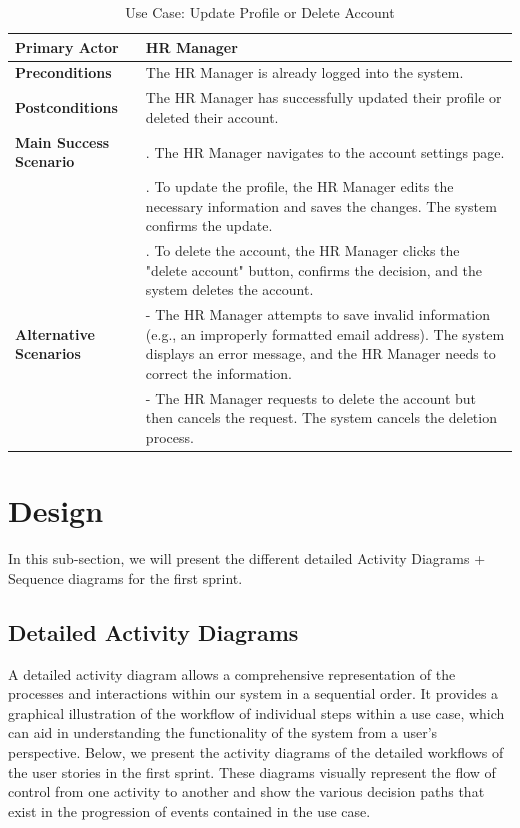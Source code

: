 \begin{table}[H]
    \renewcommand{\arraystretch}{1.5}%
    \caption{Use Case: Update Profile or Delete Account}
    \centering
    \medskip
    \begin{tabularx}{\textwidth} {
            | >{\hsize=0.5\hsize\raggedright\arraybackslash}X
            | >{\hsize=1.5\hsize\raggedright\arraybackslash}X |}
        \hline
        \textbf{Primary Actor} & HR Manager \\
        \hline
        \textbf{Preconditions} & The HR Manager is already logged into the system. \\
        \hline
        \textbf{Postconditions} & The HR Manager has successfully updated their profile or deleted their account. \\
        \hline
        \textbf{Main Success Scenario} & 1. The HR Manager navigates to the account settings page. \\
        & 2. To update the profile, the HR Manager edits the necessary information and saves the changes. The system confirms the update. \\
        & 3. To delete the account, the HR Manager clicks the "delete account" button, confirms the decision, and the system deletes the account. \\
        \hline
        \textbf{Alternative Scenarios} & - The HR Manager attempts to save invalid information (e.g., an improperly formatted email address). The system displays an error message, and the HR Manager needs to correct the information. \\
        & - The HR Manager requests to delete the account but then cancels the request. The system cancels the deletion process. \\
        \hline
    \end{tabularx}
\end{table}



\section{Design} 
In this sub-section, we will present the different detailed Activity Diagrams + Sequence diagrams for the first sprint.

\subsection{Detailed Activity Diagrams}

A detailed activity diagram allows a comprehensive representation of the processes and interactions within our system in a sequential order. 
It provides a graphical illustration of the workflow of individual steps within a use case, which can aid in understanding the functionality of the system from a user's perspective. Below, we present the activity diagrams of the detailed workflows of the user stories in the first sprint. 
These diagrams visually represent the flow of control from one activity to another and show the various decision paths that exist in the progression of events contained in the use case.

